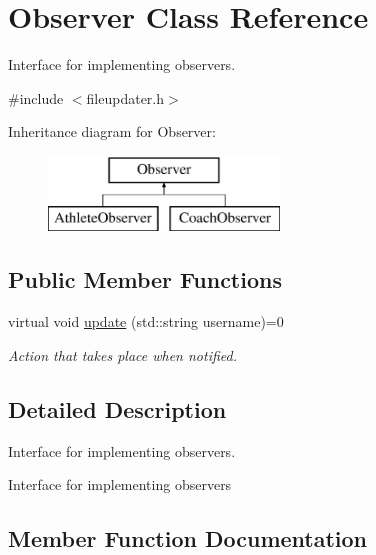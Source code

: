 \hypertarget{classObserver}{}\section{Observer Class Reference}
\label{classObserver}


Interface for implementing observers.  




{\ttfamily \#include $<$fileupdater.\+h$>$}

Inheritance diagram for Observer\+:\begin{figure}[H]
\begin{center}
\leavevmode
\includegraphics[height=2.000000cm]{classObserver}
\end{center}
\end{figure}
\subsection*{Public Member Functions}
\begin{DoxyCompactItemize}
\item 
virtual void \mbox{\hyperlink{classObserver_a8de6a6c3270b66dfe4cf5a172705a4b1}{update}} (std\+::string username)=0
\begin{DoxyCompactList}\small\item\em Action that takes place when notified. \end{DoxyCompactList}\end{DoxyCompactItemize}


\subsection{Detailed Description}
Interface for implementing observers. 

Interface for implementing observers 

\subsection{Member Function Documentation}
\mbox{\label{classObserver_a8de6a6c3270b66dfe4cf5a172705a4b1}} 
